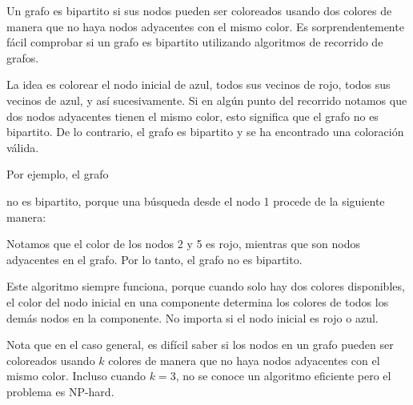 
Un grafo es bipartito si sus nodos pueden ser coloreados
usando dos colores de manera que no haya nodos adyacentes
con el mismo color.
Es sorprendentemente fácil comprobar si un grafo
es bipartito utilizando algoritmos de recorrido de grafos.

La idea es colorear el nodo inicial de azul,
todos sus vecinos de rojo, todos sus vecinos de azul, y así sucesivamente.
Si en algún punto del recorrido notamos que
dos nodos adyacentes tienen el mismo color,
esto significa que el grafo no es bipartito.
De lo contrario, el grafo es bipartito y se ha encontrado una coloración
válida.

Por ejemplo, el grafo
\begin{center}
\end{center}
no es bipartito, porque una búsqueda desde el nodo 1
procede de la siguiente manera:
\begin{center}
\end{center}
Notamos que el color de los nodos 2 y 5
es rojo, mientras que son nodos adyacentes en el grafo.
Por lo tanto, el grafo no es bipartito.

Este algoritmo siempre funciona, porque cuando
solo hay dos colores disponibles,
el color del nodo inicial en una componente
determina los colores de todos los demás nodos en la componente.
No importa si el
nodo inicial es rojo o azul.

Nota que en el caso general,
es difícil saber si los nodos
en un grafo pueden ser coloreados usando $k$ colores
de manera que no haya nodos adyacentes con el mismo color.
Incluso cuando $k=3$, no se conoce un algoritmo eficiente
pero el problema es NP-hard.
